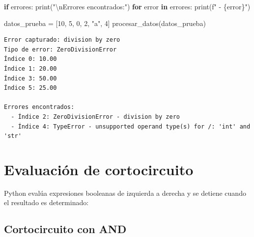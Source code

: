 \documentclass[
  doc,
  floatsintext,
  longtable,
  a4paper,
  nolmodern,
  notxfonts,
  notimes,
  12pt,
  colorlinks=true,linkcolor=blue,citecolor=blue,urlcolor=blue]{apa7}
\newenvironment{Shaded}{\begin{snugshade}}{\end{snugshade}}
\newcommand{\BuiltInTok}[1]{\textcolor[rgb]{0.00,0.23,0.31}{#1}}
\newcommand{\CharTok}[1]{\textcolor[rgb]{0.13,0.47,0.30}{#1}}
\newcommand{\ControlFlowTok}[1]{\textcolor[rgb]{0.00,0.23,0.31}{\textbf{#1}}}
\newcommand{\DecValTok}[1]{\textcolor[rgb]{0.68,0.00,0.00}{#1}}
\newcommand{\KeywordTok}[1]{\textcolor[rgb]{0.00,0.23,0.31}{\textbf{#1}}}
\newcommand{\NormalTok}[1]{\textcolor[rgb]{0.00,0.23,0.31}{#1}}
\newcommand{\OperatorTok}[1]{\textcolor[rgb]{0.37,0.37,0.37}{#1}}
\newcommand{\SpecialCharTok}[1]{\textcolor[rgb]{0.37,0.37,0.37}{#1}}
\newcommand{\SpecialStringTok}[1]{\textcolor[rgb]{0.13,0.47,0.30}{#1}}
\newcommand{\StringTok}[1]{\textcolor[rgb]{0.13,0.47,0.30}{#1}}
\begin{document}
\begin{Shaded}
\begin{Highlighting}[]
    \ControlFlowTok{if}\NormalTok{ errores:}
        \BuiltInTok{print}\NormalTok{(}\StringTok{"}\CharTok{\textbackslash{}n}\StringTok{Errores encontrados:"}\NormalTok{)}
        \ControlFlowTok{for}\NormalTok{ error }\KeywordTok{in}\NormalTok{ errores:}
            \BuiltInTok{print}\NormalTok{(}\SpecialStringTok{f"  {-} }\SpecialCharTok{\{}\NormalTok{error}\SpecialCharTok{\}}\SpecialStringTok{"}\NormalTok{)}

\NormalTok{datos\_prueba }\OperatorTok{=}\NormalTok{ [}\DecValTok{10}\NormalTok{, }\DecValTok{5}\NormalTok{, }\DecValTok{0}\NormalTok{, }\DecValTok{2}\NormalTok{, }\StringTok{"a"}\NormalTok{, }\DecValTok{4}\NormalTok{]}
\NormalTok{procesar\_datos(datos\_prueba)}
\end{Highlighting}
\end{Shaded}

\begin{verbatim}
Error capturado: division by zero
Tipo de error: ZeroDivisionError
Índice 0: 10.00
Índice 1: 20.00
Índice 3: 50.00
Índice 5: 25.00

Errores encontrados:
  - Índice 2: ZeroDivisionError - division by zero
  - Índice 4: TypeError - unsupported operand type(s) for /: 'int' and 'str'
\end{verbatim}

\section{Evaluación de
cortocircuito}\label{evaluaciuxf3n-de-cortocircuito}

Python evalúa expresiones booleanas de izquierda a derecha y se detiene
cuando el resultado es determinado:

\subsection{Cortocircuito con AND}\label{cortocircuito-con-and}
\end{document}
